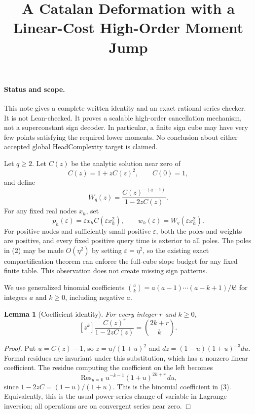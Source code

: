 \documentclass[11pt]{article}
\title{A Catalan Deformation with a Linear-Cost High-Order Moment Jump}
\author{}
\date{}
\newtheorem{lemma}{Lemma}
\begin{document}
\maketitle

\paragraph{Status and scope.}
This note gives a complete written identity and an exact rational
series checker. It is not Lean-checked. It proves a scalable
high-order cancellation mechanism, not a superconstant sign decoder.
In particular, a finite sign cube may have very few points satisfying
the required lower moments. No conclusion about either accepted global
HeadComplexity target is claimed.

Let $q\geq2$. Let $C(z)$ be the analytic solution near zero of
\[
 C(z)=1+zC(z)^2,\qquad C(0)=1,
\]
and define
\[
 W_q(z)=\frac{C(z)^{-(q-1)}}{1-2zC(z)}.
 \tag{1}
\]
For any fixed real nodes $x_h$, set
\[
 p_h(\varepsilon)=\varepsilon x_h C(\varepsilon x_h^2),
 \qquad w_h(\varepsilon)=W_q(\varepsilon x_h^2).
 \tag{2}
\]
For positive nodes and sufficiently small positive $\varepsilon$,
both the poles and weights are positive, and every fixed positive
query time is exterior to all poles. The poles in (2) may be made
$O(\eta^2)$ by setting $\varepsilon=\eta^2$, so the existing exact
compactification theorem can enforce the full-cube slope budget for
any fixed finite table. This observation does not create missing sign
patterns.

We use generalized binomial coefficients
$\binom{a}{k}=a(a-1)\cdots(a-k+1)/k!$ for integers $a$ and
$k\geq0$, including negative $a$.

\begin{lemma}[Coefficient identity]
For every integer $r$ and $k\geq0$,
\[
 [z^k]\frac{C(z)^r}{1-2zC(z)}=\binom{2k+r}{k}.
 \tag{3}
\]
\end{lemma}
\begin{proof}
Put $u=C(z)-1$, so $z=u/(1+u)^2$ and
$dz=(1-u)(1+u)^{-3}du$. Formal residues are invariant under this
substitution, which has a nonzero linear coefficient. The residue
computing the coefficient on the left becomes
\[
 \operatorname{Res}_{u=0}
 u^{-k-1}(1+u)^{2k+r}\,du,
\]
since $1-2zC=(1-u)/(1+u)$. This is the binomial coefficient in (3).
Equivalently, this is the usual power-series change of variable in
Lagrange inversion; all operations are on convergent series near zero.
\end{proof}
\end{document}
